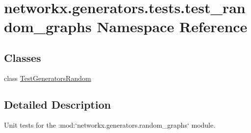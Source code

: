 \hypertarget{namespacenetworkx_1_1generators_1_1tests_1_1test__random__graphs}{}\section{networkx.\+generators.\+tests.\+test\+\_\+random\+\_\+graphs Namespace Reference}
\label{namespacenetworkx_1_1generators_1_1tests_1_1test__random__graphs}
\subsection*{Classes}
\begin{DoxyCompactItemize}
\item 
class \hyperlink{classnetworkx_1_1generators_1_1tests_1_1test__random__graphs_1_1TestGeneratorsRandom}{Test\+Generators\+Random}
\end{DoxyCompactItemize}


\subsection{Detailed Description}
\begin{DoxyVerb}Unit tests for the :mod:`networkx.generators.random_graphs` module.\end{DoxyVerb}
 